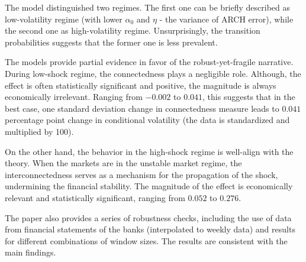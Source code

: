 \documentclass{article}
\begin{document}
The model distinguished two regimes. The first one can be briefly described as low-volatility regime (with lower $\alpha_0$ and $\eta$ - the variance of ARCH error), while the second one as high-volatility regime. Unsurprisingly, the transition probabilities suggests that the former one is less prevalent. 

The models provide partial evidence in favor of the robust-yet-fragile narrative. During low-shock regime, the connectedness plays a negligible role. Although, the effect is often statistically significant and positive, the magnitude is always economically irrelevant. Ranging from $-0.002$ to $0.041$, this suggests that in the best case, one standard deviation change in connectedness measure leads to $0.041$ percentage point change in conditional volatility (the data is standardized and multiplied by 100). 

On the other hand, the behavior in the high-shock regime is well-align with the theory. When the markets are in the unstable market regime, the interconnectedness serves as a mechanism for the propagation of the shock, undermining the financial stability. The magnitude of the effect is economically relevant and statistically significant, ranging from $0.052$ to $0.276$. 

The paper also provides a series of robustness checks, including the use of data from financial statements of the banks (interpolated to weekly data) and results for different combinations of window sizes. The results are consistent with the main findings.
\end{document}
